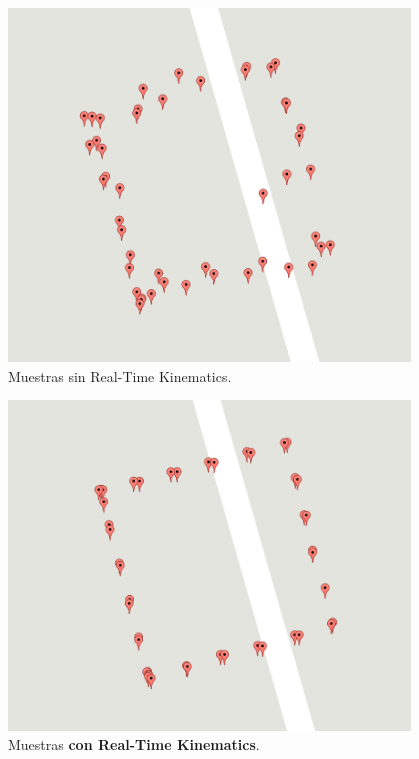 \begin{figure}[H]
\centering
\includegraphics[width=0.95\textwidth]{Figures/NoRtkRes}
\caption[Muestras sin Real-Time Kinematics.]{Muestras sin Real-Time Kinematics.}
\label{fig:NoRtkRes}
\end{figure}

\begin{figure}[H]
\centering
\includegraphics[width=0.95\textwidth]{Figures/RtkRes}
\caption[Muestras con Real-Time Kinematics.]{Muestras \textbf{con Real-Time Kinematics}.}
\label{fig:RtkRes}
\end{figure}

